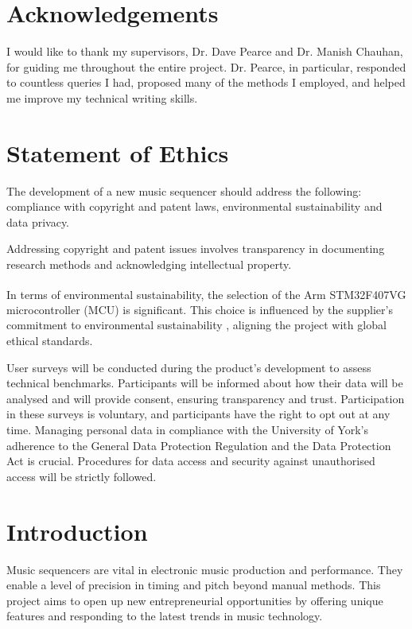 \documentclass[12pt]{article}
\numberwithin{subsubsubsection}{subsubsection}
\begin{document}
\newpage

\tableofcontents
\newpage


\newpage

\section*{Acknowledgements}
I would like to thank my supervisors, Dr. Dave Pearce and Dr. Manish Chauhan, for guiding me throughout the entire project. Dr. Pearce, in particular, responded to countless queries I had, proposed many of the methods I employed, and helped me improve my technical writing skills.

\newpage


\section*{Statement of Ethics}
The development of a new music sequencer should address the following: compliance with copyright and patent laws, environmental sustainability and data privacy.

Addressing copyright and patent issues involves transparency in documenting research methods and acknowledging intellectual property.

In terms of environmental sustainability, the selection of the Arm\textsuperscript{\textregistered} STM32F407VG microcontroller (MCU) is significant. This choice is influenced by the supplier's commitment to environmental sustainability \cite{STM3}, aligning the project with global ethical standards.

User surveys will be conducted during the product's development to assess technical benchmarks. Participants will be informed about how their data will be analysed and will provide consent, ensuring transparency and trust. Participation in these surveys is voluntary, and participants have the right to opt out at any time. Managing personal data in compliance with the University of York's adherence to the General Data Protection Regulation and the Data Protection Act \cite{Data1} is crucial. Procedures for data access and security against unauthorised access will be strictly followed.


\newpage





\newpage
{}
\section{Introduction}
Music sequencers are vital in electronic music production and performance. They enable a level of precision in timing and pitch beyond manual methods. This project aims to open up new entrepreneurial opportunities by offering unique features and responding to the latest trends in music technology.
\end{document}

